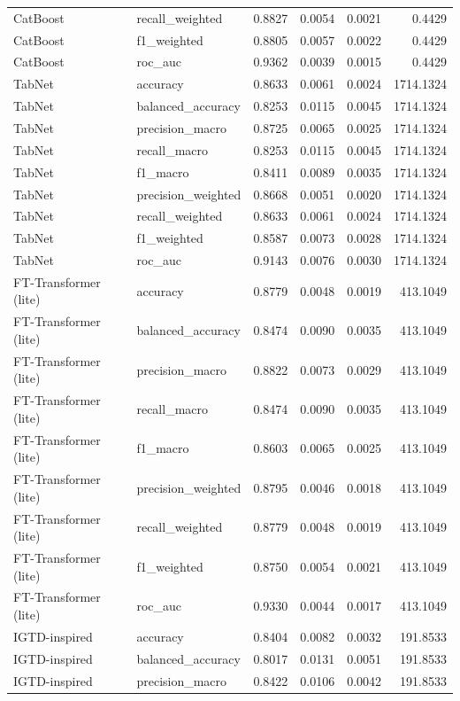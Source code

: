 \begin{tabular}{llrrrr}
CatBoost & recall_weighted & 0.8827 & 0.0054 & 0.0021 & 0.4429 \\
CatBoost & f1_weighted & 0.8805 & 0.0057 & 0.0022 & 0.4429 \\
CatBoost & roc_auc & 0.9362 & 0.0039 & 0.0015 & 0.4429 \\
TabNet & accuracy & 0.8633 & 0.0061 & 0.0024 & 1714.1324 \\
TabNet & balanced_accuracy & 0.8253 & 0.0115 & 0.0045 & 1714.1324 \\
TabNet & precision_macro & 0.8725 & 0.0065 & 0.0025 & 1714.1324 \\
TabNet & recall_macro & 0.8253 & 0.0115 & 0.0045 & 1714.1324 \\
TabNet & f1_macro & 0.8411 & 0.0089 & 0.0035 & 1714.1324 \\
TabNet & precision_weighted & 0.8668 & 0.0051 & 0.0020 & 1714.1324 \\
TabNet & recall_weighted & 0.8633 & 0.0061 & 0.0024 & 1714.1324 \\
TabNet & f1_weighted & 0.8587 & 0.0073 & 0.0028 & 1714.1324 \\
TabNet & roc_auc & 0.9143 & 0.0076 & 0.0030 & 1714.1324 \\
FT-Transformer (lite) & accuracy & 0.8779 & 0.0048 & 0.0019 & 413.1049 \\
FT-Transformer (lite) & balanced_accuracy & 0.8474 & 0.0090 & 0.0035 & 413.1049 \\
FT-Transformer (lite) & precision_macro & 0.8822 & 0.0073 & 0.0029 & 413.1049 \\
FT-Transformer (lite) & recall_macro & 0.8474 & 0.0090 & 0.0035 & 413.1049 \\
FT-Transformer (lite) & f1_macro & 0.8603 & 0.0065 & 0.0025 & 413.1049 \\
FT-Transformer (lite) & precision_weighted & 0.8795 & 0.0046 & 0.0018 & 413.1049 \\
FT-Transformer (lite) & recall_weighted & 0.8779 & 0.0048 & 0.0019 & 413.1049 \\
FT-Transformer (lite) & f1_weighted & 0.8750 & 0.0054 & 0.0021 & 413.1049 \\
FT-Transformer (lite) & roc_auc & 0.9330 & 0.0044 & 0.0017 & 413.1049 \\
IGTD-inspired & accuracy & 0.8404 & 0.0082 & 0.0032 & 191.8533 \\
IGTD-inspired & balanced_accuracy & 0.8017 & 0.0131 & 0.0051 & 191.8533 \\
IGTD-inspired & precision_macro & 0.8422 & 0.0106 & 0.0042 & 191.8533 \\

\end{tabular}

